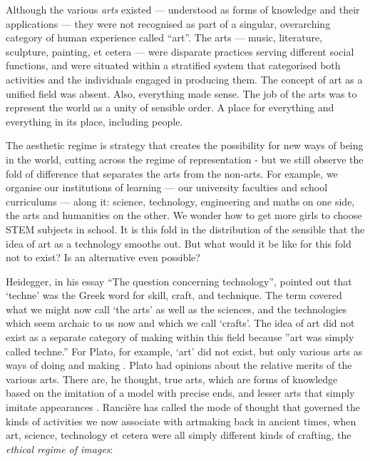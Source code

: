\documentclass[letterpaper]{article}
\begin{document}
    Although the various \emph{arts} existed — understood as forms of knowledge and their applications — they were not recognised as part of a singular, overarching category of human experience called “art”. The arts — music, literature, sculpture, painting, et cetera — were disparate practices serving different social functions, and were situated within a stratified system that categorised both activities and the individuals engaged in producing them. The concept of art as a unified field was absent. Also, everything made sense. The job of the arts was to represent the world as a unity of sensible order. A place for everything and everything in its place, including people.
    
    The aesthetic regime is strategy that creates the possibility for new ways of being in the world, cutting across the regime of representation - but we still observe the fold of difference that separates the arts from the non-arts. For example, we organise our institutions of learning — our university faculties and school curriculums — along it: science, technology, engineering and maths on one side, the arts and humanities on the other. We wonder how to get more girls to choose STEM subjects in school. It is this fold in the distribution of the sensible that the idea of art as a technology smooths out. But what would it be like for this fold not to exist? Is an alternative even possible?

    Heidegger, in his essay “The question concerning technology”, pointed out that ‘techne’ was the Greek word for skill, craft, and technique. The term covered what we might now call ‘the arts’ as well as the sciences, and the technologies which seem archaic to us now and which we call ‘crafts’. The idea of art did not exist as a separate category of making within this field because ”art was simply called techne.” \citep[p34]{HeideggerThQstnCncrngTchnlgy1954} For Plato, for example, ‘art’ did not exist, but only various arts as ways of doing and making \citep[p.20]{RancierPltcsOfThAsthtcs2004}. Plato had opinions about the relative merits of the various arts. There are, he thought, true arts, which are forms of knowledge based on the imitation of a model with precise ends, and lesser arts that simply imitate appearances \citep[p.20]{RancierPltcsOfThAsthtcs2004}.  Rancière has called the mode of thought that governed the kinds of activities we now associate with artmaking back in ancient times, when art, science, technology et cetera were all simply different kinds of crafting, the \emph{ethical regime of images}:
\end{document}
